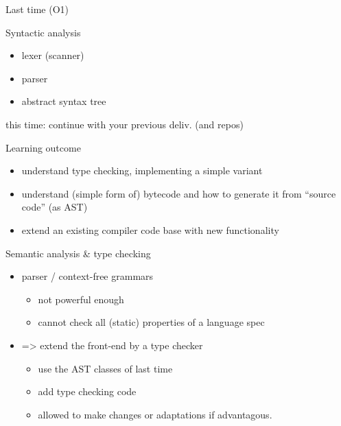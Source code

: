 \documentclass{beamer}
\begin{document}
\begin{frame}[label={sec:orge1ba405}]{Last time (O1)}
\begin{block}{Syntactic analysis}
\begin{itemize}
\item lexer (scanner)
\item parser
\item abstract syntax tree
\end{itemize}
\end{block}



\alert{this time}: continue with your previous deliv. (and repos)
\end{frame}



\begin{frame}[label={sec:org2259986}]{Learning outcome}
\begin{itemize}
\item understand type checking, implementing a simple variant
\end{itemize}


\begin{itemize}
\item understand (simple form of) bytecode and how to generate it from ``source
code'' (as AST)

\item extend an existing compiler code base with new functionality
\end{itemize}
\end{frame}



\begin{frame}[label={sec:orge9e16b8}]{Semantic analysis \& type checking}
\begin{itemize}
\item parser / context-free  grammars 
\begin{itemize}
\item not powerful enough
\item cannot check all (static) properties of a language spec
\end{itemize}

\item => extend the front-end by a type checker

\begin{itemize}
\item use the AST classes of last time
\item add type checking code
\item allowed to make \alert{changes} or adaptations if advantagous.
\end{itemize}
\end{itemize}
\end{frame}
\end{document}
